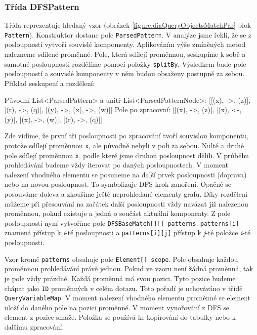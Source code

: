 \subsubsection{Třída DFSPattern}

Třída reprezentuje hledaný vzor (obrázek \ref{figure.diaQueryObjectsMatchPar} blok \texttt{Pattern}).
Konstruktor dostane pole \texttt{ParsedPattern}.
V analýze jsme řekli, že se z posloupností vytvoří souvislé kompomenty.
Aplikováním výše zmíněných metod nalezneme sdílené proměnné.
Pole, která sdílejí proměnnou, seskupíme k sobě a samotné posloupnosti rozdělíme pomocí položky \texttt{splitBy}.
Výsledkem bude pole posloupností a souvislé komponenty v něm budou obsaženy postupně za sebou.
Příklad seskupení a rozdělení:
\begin{code}
Původní List<ParsedPattern> a unitř List<ParsedPatternNode>:
[[(x), ->, (z)], [(r), ->, (q)], [(y), ->, (x), ->, (w)]]
Pole po zpracovní:
[[(x), ->, (z)], [(x), <-, (y)], [(x), ->, (w)], [(r), ->, (q)]]
\end{code}
Zde vidíme, že první tři posloupnosti po zpracování tvoří souvislou komponentu, protože sdílejí proměnnou \texttt{x}, ale původně nebyli v poli za sebou.
Nulté a druhé pole sdílejí proměnnou \texttt{x}, podle které jsme druhou posloupnost dělili.
V průběhu prohledávání budeme vždy iterovat po daných posloupnostech.
V moment nalezení vhodného elementu se posuneme na další prvek posloupnosti (doprava) nebo na novou posloupnost.
To symbolizuje DFS krok zanoření.
Opačně se posouváme doleva a zkoušíme ještě neprohledané elementy grafu.
Díky rozdělení můžeme při přesouvání na začátek další posloupnosti vždy navázat již nalezenou proměnnou, pokud existuje a jedná o součást aktuální komponenty.
Z pole posloupnosti nyní vytvoříme pole \texttt{DFSBaseMatch[][] patterns}.
\texttt{patterns[i]} znamená přístup k \textit{i}-té posloupnosti a \texttt{patterns[i][j]} přístup k \textit{j}-té položce  \textit{i}-té posloupnosti. 

Vzor kromě \texttt{patterns} obsahuje pole \texttt{Element[] scope}.
Pole obsahuje každou proměnnou prohledávání právě jednou. 
Pokud ve vzoru není žádná proměnná, tak je pole vždy prázdné.
Každá proměnná má svou pozici.
Tyto pozice budeme chápat jako \texttt{ID} proměnných v celém dotazu.
Toto pořadí je uchováváno v třídě \texttt{QueryVariableMap}.
V moment nalezení vhodného elementu proměnné se element uloží do daného pole na pozici proměnné.
V moment vynořování z DFS se element z pozice smaže.
Položka se používá ke kopírování do tabulky nebo k dalšímu zpracování.

